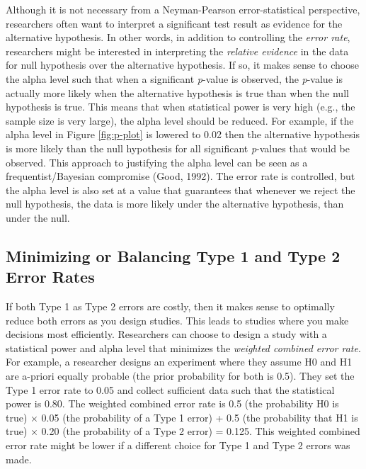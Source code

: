 \documentclass[
  english,
  ,man, a4paper,floatsintext]{apa6}
\begin{document}
Although it is not necessary from a Neyman-Pearson error-statistical perspective, researchers often want to interpret a significant test result as evidence for the alternative hypothesis. In other words, in addition to controlling the \emph{error rate}, researchers might be interested in interpreting the \emph{relative evidence} in the data for null hypothesis over the alternative hypothesis. If so, it makes sense to choose the alpha level such that when a significant \emph{p}-value is observed, the \emph{p}-value is actually more likely when the alternative hypothesis is true than when the null hypothesis is true. This means that when statistical power is very high (e.g., the sample size is very large), the alpha level should be reduced. For example, if the alpha level in Figure \ref{fig:p-plot} is lowered to 0.02 then the alternative hypothesis is more likely than the null hypothesis for all significant \emph{p}-values that would be observed. This approach to justifying the alpha level can be seen as a frequentist/Bayesian compromise (Good, 1992). The error rate is controlled, but the alpha level is also set at a value that guarantees that whenever we reject the null hypothesis, the data is more likely under the alternative hypothesis, than under the null.

\hypertarget{minimizing-or-balancing-type-1-and-type-2-error-rates}{%
\subsection{Minimizing or Balancing Type 1 and Type 2 Error Rates}\label{minimizing-or-balancing-type-1-and-type-2-error-rates}}

If both Type 1 as Type 2 errors are costly, then it makes sense to optimally reduce both errors as you design studies. This leads to studies where you make decisions most efficiently. Researchers can choose to design a study with a statistical power and alpha level that minimizes the \emph{weighted combined error rate}. For example, a researcher designs an experiment where they assume H0 and H1 are a-priori equally probable (the prior probability for both is 0.5). They set the Type 1 error rate to 0.05 and collect sufficient data such that the statistical power is 0.80. The weighted combined error rate is 0.5 (the probability H0 is true) × 0.05 (the probability of a Type 1 error) + 0.5 (the probability that H1 is true) × 0.20 (the probability of a Type 2 error) = 0.125. This weighted combined error rate might be lower if a different choice for Type 1 and Type 2 errors was made.
\end{document}
